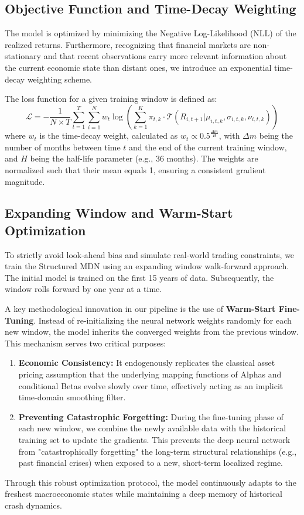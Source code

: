 \documentclass[12pt]{article}
\begin{document}
\subsection{Objective Function and Time-Decay Weighting}
\label{subsec:objective}

The model is optimized by minimizing the Negative Log-Likelihood (NLL) of the realized returns. Furthermore, recognizing that financial markets are non-stationary and that recent observations carry more relevant information about the current economic state than distant ones, we introduce an exponential time-decay weighting scheme. 

The loss function for a given training window is defined as:
\begin{equation}
    \mathcal{L} = - \frac{1}{N \times T} \sum_{t=1}^{T} \sum_{i=1}^{N} w_{t} \log \left( \sum_{k=1}^{K} \pi_{t,k} \cdot \mathcal{T}(R_{i,t+1} | \mu_{i,t,k}, \sigma_{i,t,k}, \nu_{i,t,k}) \right)
\end{equation}
where $w_{t}$ is the time-decay weight, calculated as $w_{t} \propto 0.5^{\frac{\Delta m}{H}}$, with $\Delta m$ being the number of months between time $t$ and the end of the current training window, and $H$ being the half-life parameter (e.g., 36 months). The weights are normalized such that their mean equals 1, ensuring a consistent gradient magnitude.

\subsection{Expanding Window and Warm-Start Optimization}
\label{subsec:optimization}

To strictly avoid look-ahead bias and simulate real-world trading constraints, we train the Structured MDN using an expanding window walk-forward approach. The initial model is trained on the first 15 years of data. Subsequently, the window rolls forward by one year at a time.

A key methodological innovation in our pipeline is the use of \textbf{Warm-Start Fine-Tuning}. Instead of re-initializing the neural network weights randomly for each new window, the model inherits the converged weights from the previous window. This mechanism serves two critical purposes:
\begin{enumerate}
    \item \textbf{Economic Consistency:} It endogenously replicates the classical asset pricing assumption that the underlying mapping functions of Alphas and conditional Betas evolve slowly over time, effectively acting as an implicit time-domain smoothing filter.
    \item \textbf{Preventing Catastrophic Forgetting:} During the fine-tuning phase of each new window, we combine the newly available data with the historical training set to update the gradients. This prevents the deep neural network from "catastrophically forgetting" the long-term structural relationships (e.g., past financial crises) when exposed to a new, short-term localized regime.
\end{enumerate}
Through this robust optimization protocol, the model continuously adapts to the freshest macroeconomic states while maintaining a deep memory of historical crash dynamics.
\end{document}
